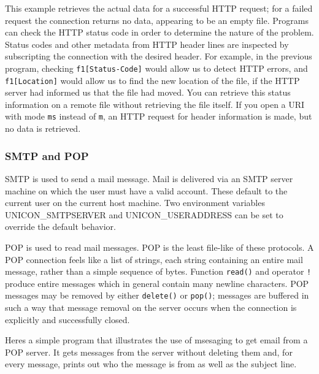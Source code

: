 This example retrieves the actual data for a successful HTTP request;
for a failed request the connection returns no data, appearing to be an
empty file. Programs can check the HTTP status code in order to
determine the nature of the problem. Status codes and other metadata
from HTTP header lines are inspected by subscripting the connection
with the desired header. For example, in the previous program, checking
\texttt{f1[{\textquotedbl}Status-Code{\textquotedbl}]} would allow us
to detect HTTP errors, and
\texttt{f1[{\textquotedbl}Location{\textquotedbl}]} would allow us to
find the new location of the file, if the HTTP server had informed us
that the file had moved. You can retrieve this status information on a
remote file without retrieving the file itself. If you open a URI with
mode \texttt{{\textquotedbl}ms{\textquotedbl}} instead of
\texttt{{\textquotedbl}m{\textquotedbl}}, an HTTP request for header
information is made, but no data is retrieved.

\subsubsection{SMTP and POP}

SMTP is used to send a mail message. Mail is delivered via
an SMTP server machine on which the user must have a valid account.
These default to the current user on the current host machine. Two
environment variables UNICON\_SMTPSERVER and UNICON\_USERADDRESS can be
set to override the default behavior.

POP is used to read mail messages. POP is the least file-like
of these protocols. A POP connection feels like a list of strings, each
string containing an entire mail message, rather than a simple sequence
of bytes. Function \texttt{read()} and operator \texttt{!} produce
entire messages which in general contain many newline characters. POP
messages may be removed by either \texttt{delete()} or \texttt{pop()};
messages are buffered in such a way that message removal on the server
occurs when the connection is explicitly and successfully closed.

Here{\textquotesingle}s a simple program that illustrates the use of
msesaging to get email from a POP server. It gets messages from the
server without deleting them and, for every message, prints out who the
message is from as well as the subject line.

